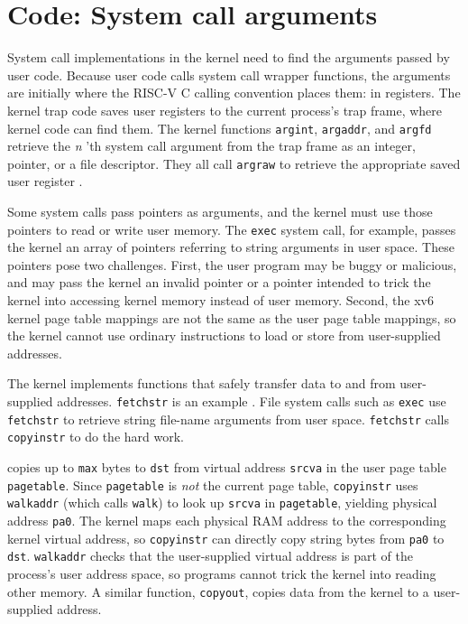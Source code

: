 \section{Code: System call arguments}

System call implementations in the kernel need to find the arguments
passed by user code. Because user code calls system call wrapper
functions, the arguments are initially where the RISC-V C calling
convention places them: in registers.
The kernel trap code saves user registers to the current
process's trap frame, where kernel code can find them.
The kernel functions
\lstinline{argint},
\lstinline{argaddr},
and
\lstinline{argfd}
retrieve the 
\textit{n} 'th 
system call argument
from the trap frame
as an integer, pointer, or a file descriptor.
They all call {\tt argraw} to retrieve the appropriate saved
user register
.

Some system calls pass pointers as arguments, and the kernel must use
those pointers to read or write user memory. The {\tt exec} system
call, for example, passes the kernel an array of pointers
referring to string arguments in user space.
These pointers pose
two challenges. First, the user program may be buggy or malicious, and
may pass the kernel an invalid pointer or a pointer intended to trick
the kernel into accessing kernel memory instead of user memory.
Second, the xv6 kernel page table mappings are not the same as the
user page table mappings, so the kernel cannot use ordinary
instructions to load or store from user-supplied addresses.

The kernel implements functions that safely transfer data to and
from user-supplied addresses.
{\tt fetchstr} is an example .
File system calls such as
{\tt exec} use {\tt fetchstr} to retrieve string file-name arguments from user
space.
\lstinline{fetchstr} calls \lstinline{copyinstr}
to do the hard work.

 copies up to \lstinline{max} bytes to
\lstinline{dst} from virtual address \lstinline{srcva} in the user page
table \lstinline{pagetable}.
Since \lstinline{pagetable} is {\it not} the current page
table,
\lstinline{copyinstr} uses {\tt walkaddr}
(which calls {\tt walk}) to look up
\lstinline{srcva} in
\lstinline{pagetable}, yielding
physical address \lstinline{pa0}.
The kernel maps each physical RAM address to the corresponding
kernel virtual address, so
{\tt copyinstr} can directly copy string bytes from {\tt pa0} to {\tt dst}.
{\tt walkaddr} 
checks that the user-supplied virtual address is part of
the process's user address space, so programs
cannot trick the kernel into reading other memory.
A similar function, {\tt copyout}, copies data from the
kernel to a user-supplied address.


